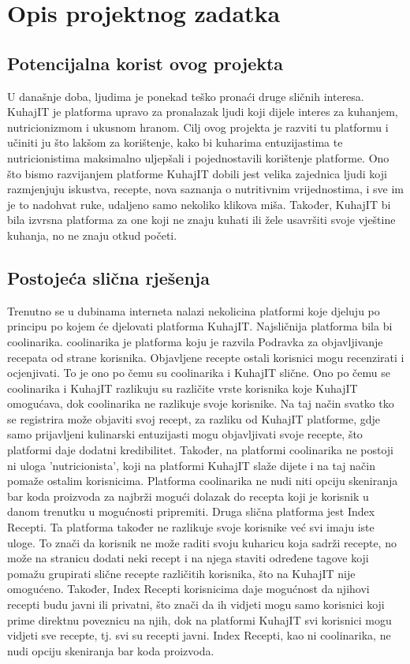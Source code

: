 \chapter{Opis projektnog zadatka}
		
		
		\section{Potencijalna korist ovog projekta}

		U današnje doba, ljudima je ponekad teško pronaći druge sličnih interesa. KuhajIT je platforma upravo za pronalazak ljudi koji dijele interes za kuhanjem, nutricionizmom i ukusnom hranom. Cilj ovog projekta je razviti tu platformu i učiniti ju što lakšom za korištenje, kako bi kuharima entuzijastima te nutricionistima maksimalno uljepšali i pojednostavili korištenje platforme. Ono što bismo razvijanjem platforme KuhajIT dobili jest velika zajednica ljudi koji razmjenjuju iskustva, recepte, nova saznanja o nutritivnim vrijednostima, i sve im je to nadohvat ruke, udaljeno samo nekoliko klikova miša. Također, KuhajIT bi bila izvrsna platforma za one koji ne znaju kuhati ili žele usavršiti svoje vještine kuhanja, no ne znaju otkud početi.
		
		\section{Postojeća slična rješenja}
		
		Trenutno se u dubinama interneta nalazi nekolicina platformi koje djeluju po principu po kojem će djelovati platforma KuhajIT. Najsličnija platforma bila bi coolinarika. coolinarika je platforma koju je razvila Podravka za objavljivanje recepata od strane korisnika. Objavljene recepte ostali korisnici mogu recenzirati i ocjenjivati. To je ono po čemu su coolinarika i KuhajIT slične. Ono po čemu se coolinarika i KuhajIT razlikuju su različite vrste korisnika koje KuhajIT omogućava, dok coolinarika ne razlikuje svoje korisnike. Na taj način svatko tko se registrira može objaviti svoj recept, za razliku od KuhajIT platforme, gdje samo prijavljeni kulinarski entuzijasti mogu objavljivati svoje recepte, što platformi daje dodatni kredibilitet. Također, na platformi coolinarika ne postoji ni uloga 'nutricionista', koji na platformi KuhajIT slaže dijete i na taj način pomaže ostalim korisnicima. Platforma coolinarika ne nudi niti opciju skeniranja bar koda proizvoda za najbrži mogući dolazak do recepta koji je korisnik u danom trenutku u mogućnosti pripremiti.
		Druga slična platforma jest Index Recepti. Ta platforma također ne razlikuje svoje korisnike već svi imaju iste uloge. To znači da korisnik ne može raditi svoju kuharicu koja sadrži recepte, no može na stranicu dodati neki recept i na njega staviti određene tagove koji pomažu grupirati slične recepte različitih korisnika, što na KuhajIT nije omogućeno. Također, Index Recepti korisnicima daje mogućnost da njihovi recepti budu javni ili privatni, što znači da ih vidjeti mogu samo korisnici koji prime direktnu poveznicu na njih, dok na platformi KuhajIT svi korisnici mogu vidjeti sve recepte, tj. svi su recepti javni. Index Recepti, kao ni coolinarika, ne nudi opciju skeniranja bar koda proizvoda.
		
